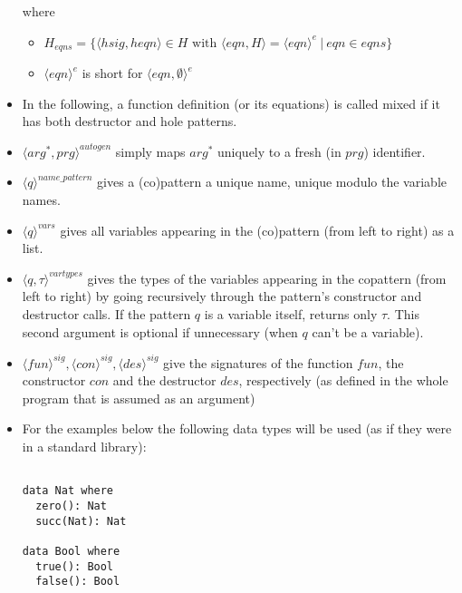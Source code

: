 \documentclass[11pt]{article} %
\begin{document}
\begin{itemize}
where
\begin{itemize}
\item $H_{eqns} = \{ \big\langle hsig, heqn \big\rangle \in H \textrm{ with } \big\langle eqn, H \big\rangle = \langle eqn \rangle^{e} ~ | ~ eqn \in eqns \}$

\item $\langle eqn \rangle^{e}$ is short for $\langle eqn, \emptyset \rangle^{e}$
\end{itemize}

\item In the following, a function definition (or its equations) is called mixed if it has both destructor and hole patterns.

\item $\langle arg^*, prg \rangle^{autogen}$ simply maps $arg^*$ uniquely to a fresh (in $prg$) identifier.

\item $\langle q \rangle^{name\_pattern}$ gives a (co)pattern a unique name, unique modulo the variable names.

\item $\langle q \rangle^{vars}$ gives all variables appearing in the (co)pattern (from left to right) as a list.

\item $\langle q, \tau \rangle^{vartypes}$ gives the types of the variables appearing in the copattern (from left to right) by going recursively through the pattern's constructor and destructor calls. If the pattern $q$ is a variable itself, returns only $\tau$. This second argument is optional if unnecessary (when $q$ can't be a variable).

\item $\langle fun \rangle^{sig}, \langle con \rangle^{sig}, \langle des \rangle^{sig}$ give the signatures of the function $fun$, the constructor $con$ and the destructor $des$, respectively (as defined in the whole program that is assumed as an argument)

\item For the examples below the following data types will be used (as if they were in a standard library):
\begin{lstlisting}

data Nat where
  zero(): Nat
  succ(Nat): Nat

data Bool where
  true(): Bool
  false(): Bool

\end{lstlisting}

\end{itemize}
\end{document}
